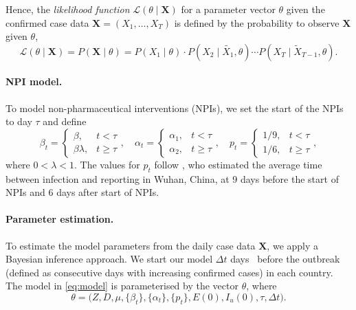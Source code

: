 \documentclass[12pt]{extarticle}
\let\vec\mathbf
\begin{document}
{Hence, the \emph{likelihood function} $\mathcal{L}(\theta \mid \vec{X})$ for a parameter vector $\theta$ given the confirmed case data $\vec{X} = (X_1, \ldots, X_T)$ is defined by the probability to observe  $\vec{X}$ given $\theta$,
\begin{equation} \label{eq:likelihood}
\mathcal{L}(\theta \mid \vec{X}) = 
P(\vec{X} \mid \theta) = 
P(X_1 \mid \theta) \cdot P(X_2 \mid \tilde{X_1}, \theta) \cdots P(X_T \mid \tilde{X}_{T-1}, \theta).
\end{equation}



\paragraph*{NPI model.}
To model non-pharmaceutical interventions (NPIs), we set the start of the NPIs to day $\tau$ and define
\begin{equation} \label{eq:NPI_model}
\beta_t = \begin{cases} 
  \beta, & t < \tau \\ 
  \beta \lambda, & t \ge \tau
\end{cases},
\quad
\alpha_t = \begin{cases} 
  \alpha_1, & t < \tau \\ 
  \alpha_2, & t \ge \tau
\end{cases},
\quad
p_t = \begin{cases} 
  1/9, & t < \tau \\ 
  1/6, & t \ge \tau
\end{cases},
\end{equation}
where $0 < \lambda < 1$.
The values for $p_t$ follow \citet{Li2020}, who estimated the average time between infection and reporting in Wuhan, China, at 9 days before the start of NPIs and 6 days after start of NPIs.



\paragraph*{Parameter estimation.}
To estimate the model parameters from the daily case data $\vec{X}$, we apply a Bayesian inference approach.
We start our model $\Delta t$ days~\citep{Gatto2020} before the outbreak (defined as consecutive days with increasing confirmed cases) in each country.
The model in \autoref{eq:model} is parameterised by the vector $\theta$, where
\begin{equation} \label{eq:theta}
\theta=\Big(Z, D, \mu, \{\beta_t\}, \{\alpha_t\}, \{p_t\}, E(0), I_u(0), \tau, \Delta t \Big).
\end{equation} 

}
\end{document}
